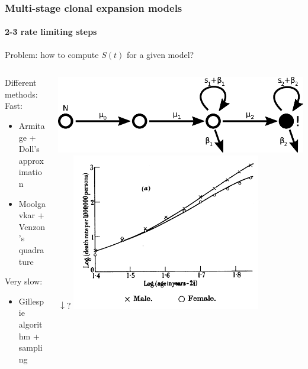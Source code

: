 \documentclass{beamer}
\begin{document}
\begin{frame}
    \frametitle{Multi-stage clonal expansion models}
    \framesubtitle{2-3 rate limiting steps\footnotemark[123]}
    Problem: how to compute $S(t)$ for a given model?

    \begin{columns}
        \begin{column}{0.5\textwidth}
        \begin{center}
        \end{center}
        Different methods:
        Fast:
        \begin{itemize}
            \item Armitage + Doll's approximation\footnotemark[1]
            \item Moolgavkar + Venzon's quadrature\footnotemark[2]
        \end{itemize}
        Very slow:
        \begin{itemize}
            \item Gillespie algorithm + sampling \footnotemark[3]
        \end{itemize}
        \end{column}
        \begin{column}{0.5\textwidth}
        \begin{center}
            \includegraphics[width=1.00\textwidth]{figures/diagram3}
            $\downarrow?$
            \includegraphics[width=0.75\textwidth]{figures/ArmitageDoll1957_4A.png}
        \end{center}
        \end{column}
    \end{columns}


\end{frame}
\end{document}

